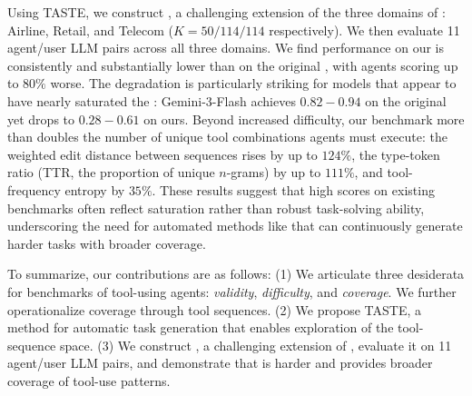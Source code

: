 Using TASTE, we construct \ourbenchmark, a challenging extension of the three domains of \taubench \citep{tau2barres}: Airline, Retail, and Telecom ($K\!=50\!/114\!/114$ respectively). We then evaluate 11 agent/user LLM pairs across all three domains. We find performance on our \ourbenchmark is consistently and substantially lower than on the original \taubench, with agents scoring up to $80\%$ worse. The degradation is particularly striking for models that appear to have nearly saturated the \taubench: Gemini-3-Flash achieves $0.82\!-\!0.94$ on the original yet drops to $0.28\!-\!0.61$ on ours. Beyond increased difficulty, our benchmark more than doubles the number of unique tool combinations agents must execute: the weighted edit distance between sequences rises by up to $124\%$, the type-token ratio (TTR, the proportion of unique $n$-grams) by up to $111\%$, and tool-frequency entropy by $35\%$. These results suggest that high scores on existing benchmarks often reflect saturation rather than robust task-solving ability, underscoring the need for automated methods like \ourbenchmark that can continuously generate harder tasks with broader coverage.

To summarize, our contributions are as follows:
(1) We articulate three desiderata for benchmarks of tool-using agents: \emph{validity}, \emph{difficulty}, and \emph{coverage}. We further operationalize coverage through tool sequences.
(2) We propose TASTE, a method for automatic task generation that enables exploration of the tool-sequence space.
(3) We construct \ourbenchmark, a challenging extension of \taubench, evaluate it on 11 agent/user LLM pairs, and demonstrate that \ourbenchmark is harder and provides broader coverage of tool-use patterns.
